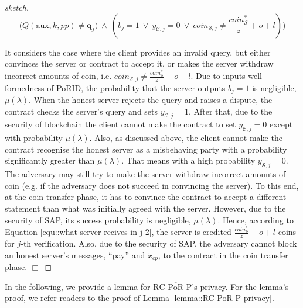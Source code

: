 \begin{proof}[sketch]
     $$\Big(Q(\text{aux},k,{pp})\neq \bm{q}_{\scriptscriptstyle j})\ \wedge \ (b_{\scriptscriptstyle j}=1\ \vee \ y_{\scriptscriptstyle\mathcal{C},j}=0 \ \vee \ coin_{\scriptscriptstyle\mathcal{S},j}\neq \frac{coin_{\scriptscriptstyle\mathcal S}^{\scriptscriptstyle*}}{z}+o+l)\Big)$$
     
       It considers the case where the client provides an invalid query, but  either convinces the server or contract to accept it, or  makes the server   withdraw  incorrect amounts of coin, i.e. $coin_{\scriptscriptstyle\mathcal{S},j}\neq \frac{coin_{\scriptscriptstyle\mathcal S}^{\scriptscriptstyle*}}{z}+o+l$. Due to inputs well-formedness of PoRID, the probability that the server outputs $b_{\scriptscriptstyle j}=1$ is negligible, $\mu(\lambda)$.  When the honest server rejects the query and raises a dispute, the contract checks the server's query and sets $y_{\scriptscriptstyle\mathcal{C},j}=1$. After that, due to the security of blockchain the client cannot make the contract to set $y_{\scriptscriptstyle\mathcal{C},j}=0$ except with probability $\mu(\lambda)$. Also, as discussed above, the client cannot make the contract recognise the  honest server as a misbehaving party with a probability significantly greater than $\mu(\lambda)$. That means with a high probability $y_{\scriptscriptstyle\mathcal{S},j}=0$.  The adversary may still try to  make the server withdraw   incorrect amounts of coin (e.g. if the adversary does not succeed in convincing the server). To this end, at the coin transfer phase, it has to convince the contract to accept a  different  statement  than what was initially agreed with the server. However, due to the security of SAP, its  success probability is negligible, $\mu(\lambda)$.     Hence, according to Equation \ref{equ::what-server-recives-in-j-2}, the server is credited  $\frac{coin_{\scriptscriptstyle\mathcal S}^{\scriptscriptstyle*}}{z}+o+l$ coins for $j$-th verification.   Also, due to the security of SAP, the adversary cannot block an honest server's  messages, ``pay'' and $\ddot{x}_{\scriptscriptstyle cp}$, to the contract in the coin transfer phase.
 \hfill\(\Box\)\end{proof}
  
  





In the following, we provide a lemma for  ${\text{RC-}\overline{\text{PoR}}\text{-P}}$'s privacy. For the lemma's  proof, we refer readers to the proof of Lemma \ref{lemma::RC-PoR-P-privacy}. 


